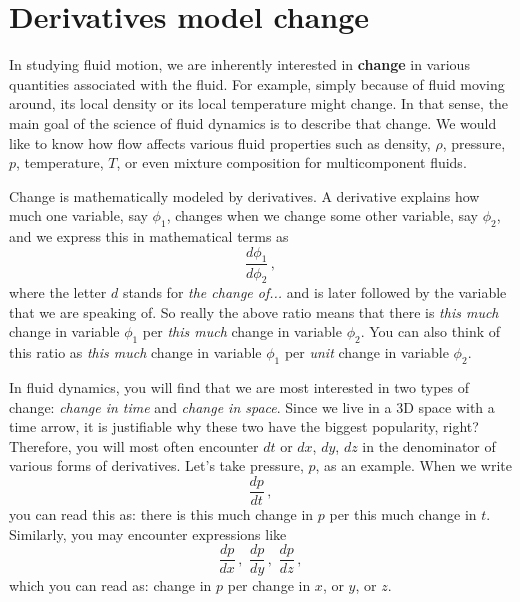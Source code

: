 

\section{Derivatives model change}

In studying fluid motion, we are inherently interested in \textbf{change} in various quantities associated with the fluid. For example, simply because of fluid moving around, its local density or its local temperature might change. In that sense, the main goal of the science of fluid dynamics is to describe that change. We would like to know how flow affects various fluid properties such as density, $\rho$, pressure, $p$, temperature, $T$, or even mixture composition for multicomponent fluids.

Change is mathematically modeled by derivatives. A derivative explains how much one variable, say $\phi_1$, changes when we change some other variable, say $\phi_2$, and we express this in mathematical terms as
\begin{equation*}\label{eq:change-d}
\frac{d \phi_1}{d \phi_2} \, ,
\end{equation*}
where the letter $d$ stands for \textit{the change of...} and is later followed by the variable that we are speaking of. So really the above ratio means that there is \textit{this much} change in variable $\phi_1$ per \textit{this much} change in variable $\phi_2$. You can also think of this ratio as \textit{this much} change in variable $\phi_1$ per \textit{unit} change in variable $\phi_2$.

In fluid dynamics, you will find that we are most interested in two types of change: \textit{change in time} and \textit{change in space}. Since we live in a 3D space with a time arrow, it is justifiable why these two have the biggest popularity, right? Therefore, you will most often encounter $dt$ or $dx$, $dy$, $dz$ in the denominator of various forms of derivatives.
Let's take pressure, $p$, as an example. When we write
\begin{equation*}\label{eq:change-p}
\frac{d p}{d t} \, ,
\end{equation*}
you can read this as: there is this much change in $p$ per this much change in $t$.
Similarly, you may encounter expressions like
\begin{equation*}\label{eq:change-p}
\frac{d p}{d x} \,  , \,\, \frac{d p}{d y} \, , \,\, \frac{d p}{d z} \, ,
\end{equation*}
which you can read as: change in $p$ per change in $x$, or $y$, or $z$.

